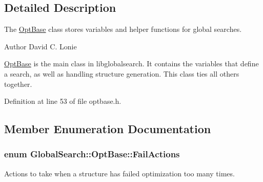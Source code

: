 \subsection{Detailed Description}
The \hyperlink{classGlobalSearch_1_1OptBase}{Opt\-Base} class stores variables and helper functions for global searches. 

\begin{DoxyAuthor}{Author}
David C. Lonie
\end{DoxyAuthor}
\hyperlink{classGlobalSearch_1_1OptBase}{Opt\-Base} is the main class in libglobalsearch. It contains the variables that define a search, as well as handling structure generation. This class ties all others together. 

Definition at line 53 of file optbase.\-h.



\subsection{Member Enumeration Documentation}
\hypertarget{classGlobalSearch_1_1OptBase_a970b328cd0a36335c34c6b24c6ac2775}{
\subsubsection[{Fail\-Actions}]{\setlength{\rightskip}{0pt plus 5cm}enum {\bf Global\-Search\-::\-Opt\-Base\-::\-Fail\-Actions}}}\label{classGlobalSearch_1_1OptBase_a970b328cd0a36335c34c6b24c6ac2775}
Actions to take when a structure has failed optimization too many times.

